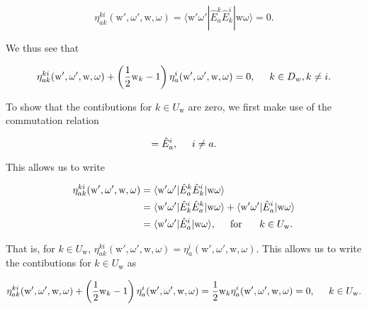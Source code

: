\documentclass[12pt,a4paper]{report}
\begin{document}
\begin{equation}\label{eq:eta_akki_kinD}
  \eta_{ak}^{ki}(\text{w}',\omega',\text{w},\omega) = \langle
  \text{w}' \omega' | \hat{E}_{a}^{k} \hat{E}_{k}^{i} | \text{w}
  \omega \rangle = 0.
\end{equation}

\noindent
We thus see that

\begin{equation}
  \eta_{ak}^{ki}(\text{w}',\omega',\text{w},\omega) + \left(
  \frac{1}{2} \text{w}_{k} -1 \right)
  \eta_{a}^{i}(\text{w}',\omega',\text{w},\omega) = 0, \hspace{0.5cm}
  k \in D_{w}, k \ne i.
\end{equation}

To show that the contibutions for $k \in U_{\text{w}}$ are zero, we
first make use of the commutation relation

\begin{equation}
  [\hat{E}_{a}^{k}, \hat{E}_{k}^{i}] = \hat{E}_{a}^{i}, \hspace{0.5cm}
  i \ne a.
\end{equation}

\noindent
This allows us to write

\begin{equation}
  \begin{aligned}
  \eta_{ak}^{ki}(\text{w}',\omega',\text{w},\omega) &= \langle
  \text{w}' \omega' | \hat{E}_{a}^{k} \hat{E}_{k}^{i} | \text{w}
  \omega \rangle \\
  &= \langle \text{w}' \omega' | \hat{E}_{k}^{i} \hat{E}_{a}^{k} |
  \text{w} \omega \rangle + \langle \text{w}' \omega' |
  \hat{E}_{a}^{i} | \text{w} \omega \rangle \\
  &= \langle \text{w}' \omega' | \hat{E}_{a}^{i} | \text{w} \omega
  \rangle, \hspace{0.5cm} \text{for } \hspace{0.5cm} k \in
  U_{\text{w}}.
  \end{aligned}
\end{equation}

\noindent
That is, for $k \in U_{\text{w}}$,
$\eta_{ak}^{ki}(\text{w}',\omega',\text{w},\omega) =
\eta_{a}^{i}(\text{w}',\omega',\text{w},\omega)$. This allows us to
write the contibutions for $k \in U_{\text{w}}$ as

\begin{equation}
  \eta_{ak}^{ki}(\text{w}',\omega',\text{w},\omega) + \left(
  \frac{1}{2} \text{w}_{k} - 1 \right)
  \eta_{a}^{i}(\text{w}',\omega',\text{w},\omega) = \frac{1}{2}
  \text{w}_{k} \eta_{a}^{i}(\text{w}',\omega',\text{w},\omega) =
  0, \hspace{0.5cm} k \in U_{\text{w}}.
\end{equation}
\end{document}
